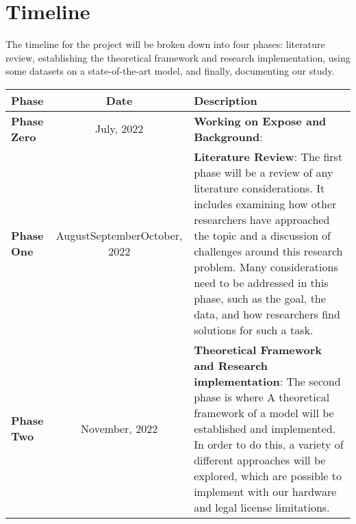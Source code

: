 
\newpage
\section{Timeline}

The timeline for the project will be broken down into four phases: literature review, establishing the theoretical framework and research implementation, using some datasets on a state-of-the-art model, and finally, documenting our study.

\begin{tabular}{|l|c|p{9.5cm}|}
    \hline
    Phase                & Date                                                                                & Description                                                                                                                                                                                                                                                                                                                                                               \\
    \hline
    \textbf{Phase Zero}  & July, 2022                                                                          & \textbf{Working on Expose and Background}:                                                                                                                                                                                                                                                                                                                                \\
    \hline
    \textbf{Phase One}   & \multicolumn{1}{p{3cm}|}{\centering August\newline September\newline October, 2022} & \textbf{Literature Review}: The first phase will be a review of any literature considerations. It includes examining how other researchers have approached the topic and a discussion of challenges around this research problem. Many considerations need to be addressed in this phase, such as the goal, the data, and how researchers find solutions for such a task. \\
    \hline
    \textbf{Phase Two}   & November, 2022                                                                      & \textbf{Theoretical Framework and Research implementation}: The second phase is where A theoretical framework of a model will be established and implemented. In order to do this, a variety of different approaches will be explored, which are possible to implement with our hardware and legal license limitations.                                                   \\

\end{tabular}
